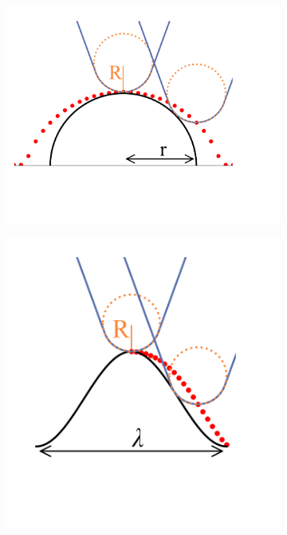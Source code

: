 \begin{figure}[H]
\centering
    \begin{subfigure}[t]{0.565\textwidth}
        \centering
        \caption{\label{fig: Compression Simulation dynamics-wave} }
        \includegraphics[trim = 0 45 0 0, clip, width=1\linewidth]{Figures/Hemisphere-SetUp.png}
    \end{subfigure}
    \hfill
    \begin{subfigure}[t]{0.415\textwidth}
        \centering
        \caption{\label{fig: Compression Simulation dynamics- wave} }
        \includegraphics[trim = 0 45 0 0, clip, width=1\linewidth]{Figures/Wave-SetUp.png}
    \end{subfigure}
    

\end{figure}
